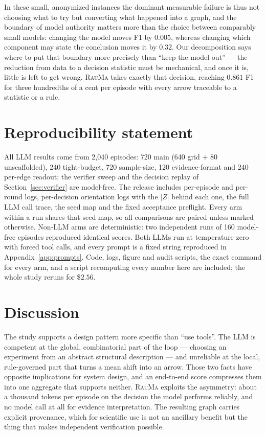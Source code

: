 \documentclass{article}
\newcommand{\rauma}{\textsc{RauMa}}
\begin{document}
In these small, anonymized instances the dominant measurable failure is thus not choosing what
to try but converting what happened into a graph, and the boundary of model authority matters
more than the choice between comparably small models: changing the model moves F1 by $0.005$,
whereas changing which component may state the conclusion moves it by $0.32$. Our decomposition
says where to put that boundary more precisely than ``keep the model out'' --- the reduction
from data to a decision statistic must be mechanical, and once it is, little is left to get
wrong. \rauma{} takes exactly that decision, reaching $0.861$ F1 for three hundredths of a cent
per episode with every arrow traceable to a statistic or a rule.

\section*{Reproducibility statement}

All LLM results come from 2{,}040 episodes: 720 main (640 grid $+$ 80 unscaffolded), 240
tight-budget, 720 sample-size, 120 evidence-format and 240 per-edge readout; the verifier sweep
and the decision replay of Section~\ref{sec:verifier} are model-free. The release includes
per-episode and per-round logs, per-decision orientation logs with the $|Z|$ behind each one,
the full LLM call trace, the seed map and the fixed acceptance preflight. Every arm within a run
shares that seed map, so all comparisons are paired unless marked otherwise. Non-LLM arms are
deterministic: two independent runs of 160 model-free episodes reproduced identical scores. Both
LLMs run at temperature zero with forced tool calls, and every prompt is a fixed string
reproduced in Appendix~\ref{app:prompts}. Code, logs, figure and audit scripts, the exact command
for every arm, and a script recomputing every number here are included; the whole study reruns
for \$$2.56$.

\appendix

\section{Discussion}
\label{sec:discussion}

The study supports a design pattern more specific than ``use tools''. The LLM is competent at
the global, combinatorial part of the loop --- choosing an experiment from an abstract
structural description --- and unreliable at the local, rule-governed part that turns a mean
shift into an arrow. Those two facts have opposite implications for system design, and an
end-to-end score compresses them into one aggregate that supports neither. \rauma{} exploits
the asymmetry: about a thousand tokens per episode on the decision the model performs
reliably, and no model call at all for evidence interpretation. The resulting graph carries
explicit provenance, which for scientific use is not an ancillary benefit but the thing that
makes independent verification possible.
\end{document}
